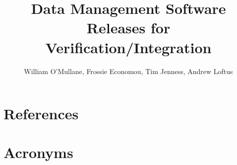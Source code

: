 \documentclass[DM]{lsstdoc}
\title[DM Releases ]{ Data Management Software Releases for Verification/Integration}
\author   {William O'Mullane, Frossie Economou, Tim Jenness, Andrew Loftus}
\begin{document}
%
%
\maketitle

%
%



\section{References\label{sect:references}}
\renewcommand{\refname}{}


\section{Acronyms}
\end{document}
